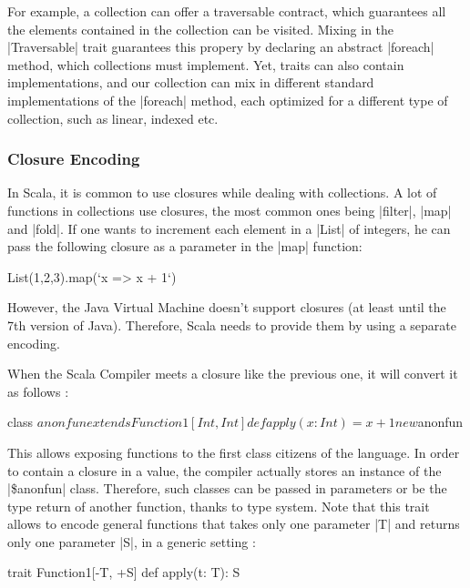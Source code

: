 For example, a collection can offer a traversable contract, which guarantees all the elements contained in the collection can be visited. Mixing in the |Traversable| trait guarantees this propery by declaring an abstract |foreach| method, which collections must implement. Yet, traits can also contain implementations, and our collection can mix in different standard implementations of the |foreach| method, each optimized for a different type of collection, such as linear, indexed etc.

\subsubsection{Closure Encoding}

In Scala, it is common to use closures while dealing with collections. A lot of functions in collections use closures, the most common ones being |filter|, |map| and |fold|. If one wants to increment each element in a |List| of integers, he can pass the following closure as a parameter in the |map| function:

\begin{lstlisting-nobreak}
 List(1,2,3).map(`x => x + 1`)
\end{lstlisting-nobreak}

However, the Java Virtual Machine doesn't support closures (at least until the 7th version of Java). Therefore, Scala needs to provide them by using a separate encoding.

When the Scala Compiler meets a closure like the previous one, it will convert it as follows :

\begin{lstlisting-nobreak}
 {
  class $anonfun extends Function1[Int, Int] {
    def apply(x: Int) = x + 1
  }

  new $anonfun
 }
\end{lstlisting-nobreak}

This allows exposing functions to the first class citizens of the language. In order to contain a closure in a value, the compiler actually stores an instance of the |\$anonfun| class. Therefore, such classes can be passed in parameters or be the type return of another function, thanks to type system. Note that this trait allows to encode general functions that takes only one parameter |T| and returns only one parameter |S|, in a generic setting :

\begin{lstlisting-nobreak}
 trait Function1[-T, +S] {
   def apply(t: T): S
 }
\end{lstlisting-nobreak}

